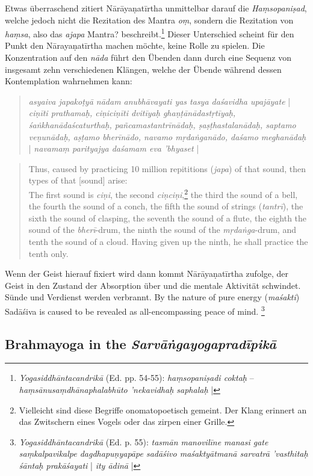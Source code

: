   Etwas überraschend zitiert Nārāyaṇatīrtha unmittelbar darauf die \textit{Haṃsopaniṣad}, welche jedoch nicht die Rezitation des Mantra \textit{oṃ}, sondern die Rezitation von \textit{haṃsa}, also das \textit{ajapa} Mantra? beschreibt.\footnote{\textit{Yogasiddhāntacandrikā} (Ed. pp. 54-55): \textit{haṃsopaniṣadi coktaḥ} – \textit{haṃsānusaṃdhānaphalabhūto 'nekavidhaḥ saphalaḥ} |} Dieser Unterschied scheint für den Punkt den Nārayaṇatīrtha machen möchte, keine Rolle zu spielen. Die Konzentration auf den \textit{nāda} führt den Übenden dann durch eine Sequenz von insgesamt zehn verschiedenen Klängen, welche der Übende während dessen Kontemplation wahrnehmen kann:
\begin{quote}
  \textit{asyaiva japakoṭyā nādam anubhāvayati yas tasya daśavidha upajāyate} | 
  \textit{ciṇīti prathamaḥ, ciṇiciṇīti dvitīyaḥ ghaṇṭānādastṛtīyaḥ, śaṅkhanādaścaturthaḥ, pañcamastantrīnādaḥ, ṣaṣṭhastalanādaḥ, saptamo veṇunādaḥ, aṣṭamo bherīnādo, navamo mṛdaṅganādo, daśamo meghanādaḥ} | \textit{navamaṃ parityajya daśamam eva 'bhyaset} |
\end{quote}
\begin{quote}
  Thus, caused by practicing 10 million repititions (\textit{japa}) of that sound, then types of that [sound] arise: \\
  The first sound is \textit{ciṇi}, the second \textit{ciṇciṇi},\footnote{Vielleicht sind diese Begriffe onomatopoetisch gemeint. Der Klang erinnert an das Zwitschern eines Vogels oder das zirpen einer Grille.} the third the sound of a bell, the fourth the sound of a conch, the fifth the sound of strings (\textit{tantrī}), the sixth the sound of clasping, the seventh the sound of a flute, the eighth the sound of the \textit{bherī}-drum, the ninth the sound of the \textit{mṛdaṅga}-drum, and tenth the sound of a cloud. Having given up the ninth, he shall practice the tenth only. 
\end{quote}

Wenn der Geist hierauf fixiert wird dann kommt Nārāyaṇatīrtha zufolge, der Geist in den Zustand der Absorption über und die mentale Aktivität schwindet. Sünde und Verdienst werden verbrannt. By the nature of pure energy (\textit{maśakti}) Sadāśiva is caused to be revealed as all-encompassing peace of mind. \footnote{\textit{Yogasiddhāntacandrikā} (Ed. p. 55): \textit{tasmān manovilīne manasi gate saṃkalpavikalpe dagdhapuṇyapāpe sadāśivo maśaktyātmanā sarvatrā 'vasthitaḥ śāntaḥ prakāśayati} | \textit{ity ādinā} |}

\subsection{Brahmayoga in the \textit{Sarvāṅgayogapradīpikā}}

